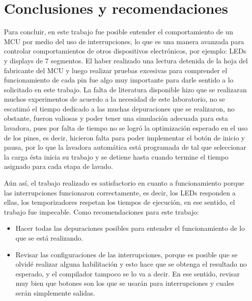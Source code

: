 \section{Conclusiones y recomendaciones}
Para concluir, en este trabajo fue posible entender el comportamiento de un MCU por medio del uso de interrupciones, lo que es una manera avanzada para controlar comportamientos de otros dispositivos electrónicos, por ejemplo: LEDs y displays de 7 segmentos. El haber realizado una lectura detenida de la hoja del fabricante del MCU y luego realizar pruebas excesivas para comprender el funcionamiento de cada pin fue algo muy importante para darle sentido a lo solicitado en este trabajo. La falta de literatura disponible hizo que se realizaran muchos experimentos de acuerdo a la necesidad de este laboratorio, no se escatimó el tiempo dedicado a las muchas depuraciones que se realizaron, no obstante, fueron valiosas y poder tener una simulación adecuada para esta lavadora, pues por falta de tiempo no se logró la optimización esperado en el uso de los pines, es decir, hicieron falta para poder implementar el botón de inicio y pausa, por lo que la lavadora automática está programada de tal que seleccionar la carga ésta inicia su trabajo y se detiene hasta cuando termine el tiempo asignado para cada etapa de lavado.\par
Aún así, el trabajo realizado es satisfactorio en cuanto a funcionamiento porque las interrupciones funcionaron correctamente, es decir, los LEDs responden a ellas, los temporizadores respetan los tiempos de ejecución, en ese sentido, el trabajo fue impecable. 
Como recomendaciones para este trabajo:
\begin{itemize}
\item Hacer todas las depuraciones posibles para entender el funcionamiento de lo que se está realizando.
\item Revisar las configuraciones de las interrupciones, porque es posible que se olvidé realizar alguna habilitación y esto hace que se obtenga el resultado no esperado, y el compilador tampoco se lo va a decir. En ese sentido, revisar muy bien que botones son los que se usarán para interrupciones y cuales serán simplemente salidas. 
\end{itemize}